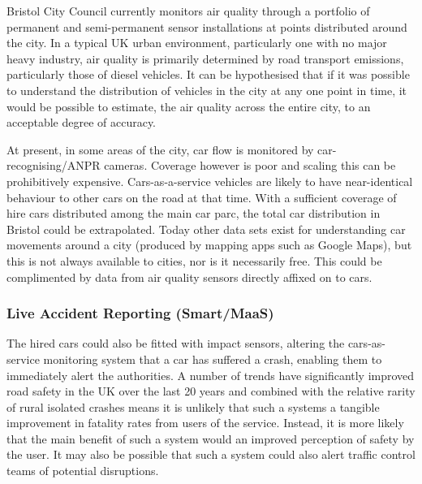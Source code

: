 \documentclass[journal]{IEEEtran}
\begin{document}
Bristol City Council currently monitors air quality through a
portfolio of permanent and semi-permanent sensor installations at
points distributed around the city. In a typical UK urban environment,
particularly one with no major heavy industry, air quality is primarily
determined by road transport emissions, particularly those of diesel
vehicles. It can be hypothesised that if it was possible to understand
the distribution of vehicles in the city at any one point in time, it
would be possible to estimate, the air quality across the entire city,
to an acceptable degree of accuracy.

At present, in some areas of the city, car flow is monitored by
car-recognising/ANPR cameras. Coverage however is poor and scaling
this can be prohibitively expensive. Cars-as-a-service vehicles are
likely to have near-identical behaviour to other cars on the road at
that time. With a sufficient coverage of hire cars distributed among
the main car parc, the total car distribution in Bristol could be
extrapolated. Today other data sets exist for understanding car
movements around a city (produced by mapping apps such as Google
Maps), but this is not always available to cities, nor is it
necessarily free. This could be complimented by data from air quality
sensors directly affixed on to cars.



\subsubsection{Live Accident Reporting (Smart/MaaS)}

The hired cars could also be fitted with impact sensors, altering the
cars-as-service monitoring system that a car has suffered a crash,
enabling them to immediately alert the authorities. A number of trends
have significantly improved road safety in the UK over the last 20
years and combined with the relative rarity of rural isolated crashes
means it is unlikely that such a systems a tangible improvement in
fatality rates from users of the service. Instead, it is more likely
that the main benefit of such a system would an improved perception of
safety by the user. It may also be possible that such a system could
also alert traffic control teams of potential disruptions.
\end{document}
